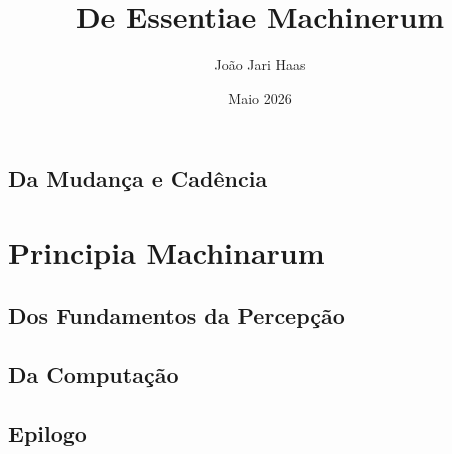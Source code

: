 \documentclass[11pt,a5paper]{article}
\title{De Essentiae Machinerum}
\author{João Jari Haas}
\date{Maio 2026}
\begin{document}
\maketitle




\subsection{Da Mudança e Cadência}

\section{Principia Machinarum}
\subsection{Dos Fundamentos da Percepção}
\subsection{Da Computação}
\subsection{Epilogo}
\end{document}
